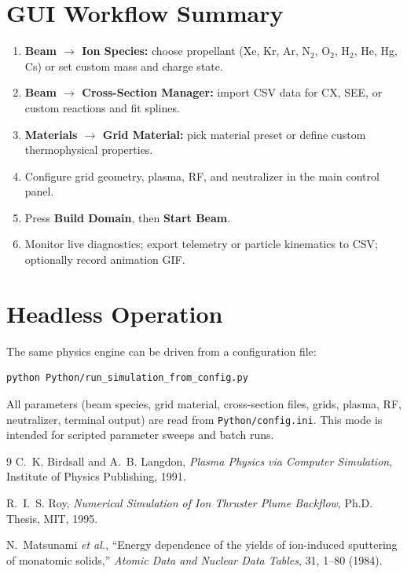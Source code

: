 \documentclass[11pt,a4paper]{article}
\begin{document}
\section{GUI Workflow Summary}

\begin{enumerate}[nosep]
    \item \textbf{Beam $\rightarrow$ Ion Species:}
        choose propellant (Xe, Kr, Ar, N\(_2\), O\(_2\), H\(_2\),
        He, Hg, Cs) or set custom mass and charge state.
    \item \textbf{Beam $\rightarrow$ Cross-Section Manager:}
        import CSV data for CX, SEE, or custom reactions and fit
        splines.
    \item \textbf{Materials $\rightarrow$ Grid Material:}
        pick material preset or define custom thermophysical
        properties.
    \item Configure grid geometry, plasma, RF, and neutralizer
        in the main control panel.
    \item Press \textbf{Build Domain}, then \textbf{Start Beam}.
    \item Monitor live diagnostics; export telemetry or particle
        kinematics to CSV; optionally record animation GIF.
\end{enumerate}

\section{Headless Operation}

The same physics engine can be driven from a configuration file:
\begin{verbatim}
python Python/run_simulation_from_config.py
\end{verbatim}
All parameters (beam species, grid material, cross-section
files, grids, plasma, RF, neutralizer, terminal output) are read
from \texttt{Python/config.ini}.  This mode is intended for
scripted parameter sweeps and batch runs.

\begin{thebibliography}{9}
C.~K. Birdsall and A.~B. Langdon,
\textit{Plasma Physics via Computer Simulation},
Institute of Physics Publishing, 1991.

R.~I.~S. Roy, \textit{Numerical Simulation of Ion Thruster Plume
Backflow}, Ph.D. Thesis, MIT, 1995.

N.~Matsunami \textit{et al.},
``Energy dependence of the yields of ion-induced sputtering of
monatomic solids,'' \textit{Atomic Data and Nuclear Data Tables},
31, 1--80 (1984).
\end{thebibliography}
\end{document}
